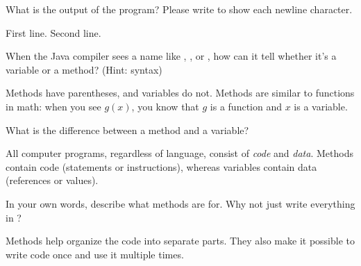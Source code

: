 \Q What is the output of the program? Please write \java{\\n} to show each newline character.

\begin{answer}[8em]
\vspace{-1ex}
\begin{javaans}
First line.\n
\n
\n
\n
Second line.\n
\end{javaans}
\end{answer}


\Q When the Java compiler sees a name like , , or , how can it tell whether it's a variable or a method? (Hint: syntax)

\begin{answer}[5em]
Methods have parentheses, and variables do not.
Methods are similar to functions in math: when you see $g(x)$, you know that $g$ is a function and $x$ is a variable.
\end{answer}


\Q What is the difference between a method and a variable?

\begin{answer}[5em]
All computer programs, regardless of language, consist of \emph{code} and \emph{data}.
Methods contain code (statements or instructions), whereas variables contain data (references or values).
\end{answer}


\Q In your own words, describe what methods are for. Why not just write everything in ?

\begin{answer}[5em]
Methods help organize the code into separate parts.
They also make it possible to write code once and use it multiple times.
\end{answer}
